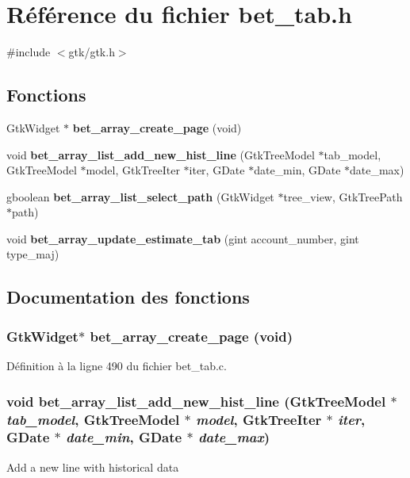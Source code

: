 \section{Référence du fichier bet\_\-tab.h}
\label{bet__tab_8h}
{\ttfamily \#include $<$gtk/gtk.h$>$}\par
\subsection*{Fonctions}
\begin{DoxyCompactItemize}
\item 
GtkWidget $\ast$ {\bf bet\_\-array\_\-create\_\-page} (void)
\item 
void {\bf bet\_\-array\_\-list\_\-add\_\-new\_\-hist\_\-line} (GtkTreeModel $\ast$tab\_\-model, GtkTreeModel $\ast$model, GtkTreeIter $\ast$iter, GDate $\ast$date\_\-min, GDate $\ast$date\_\-max)
\item 
gboolean {\bf bet\_\-array\_\-list\_\-select\_\-path} (GtkWidget $\ast$tree\_\-view, GtkTreePath $\ast$path)
\item 
void {\bf bet\_\-array\_\-update\_\-estimate\_\-tab} (gint account\_\-number, gint type\_\-maj)
\end{DoxyCompactItemize}


\subsection{Documentation des fonctions}
\subsubsection[{bet\_\-array\_\-create\_\-page}]{\setlength{\rightskip}{0pt plus 5cm}GtkWidget$\ast$ bet\_\-array\_\-create\_\-page (void)}\label{bet__tab_8h_a09149e373255d66892a1f9809e29615e}


Définition à la ligne 490 du fichier bet\_\-tab.c.

\subsubsection[{bet\_\-array\_\-list\_\-add\_\-new\_\-hist\_\-line}]{\setlength{\rightskip}{0pt plus 5cm}void bet\_\-array\_\-list\_\-add\_\-new\_\-hist\_\-line (GtkTreeModel $\ast$ {\em tab\_\-model}, \/  GtkTreeModel $\ast$ {\em model}, \/  GtkTreeIter $\ast$ {\em iter}, \/  GDate $\ast$ {\em date\_\-min}, \/  GDate $\ast$ {\em date\_\-max})}\label{bet__tab_8h_a06cdcd05c5db9dec496f47a99b7eaca5}
Add a new line with historical data 

